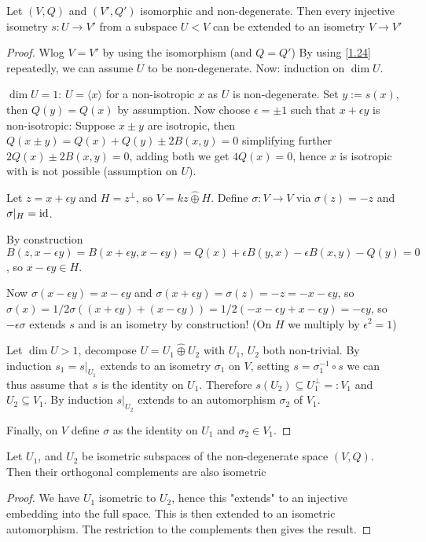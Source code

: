 \begin{theorem}[Witt]
  Let $(V, Q)$ and $(V', Q')$ isomorphic and 
  non-degenerate. Then every injective isometry 
  $s:U\to V'$ from a subspace $U<V$ can be extended to an isometry
  $V\to V'$
\end{theorem}
\begin{proof}
  Wlog $V = V'$ by using the isomorphism (and $Q = Q'$)
  By using \ref{1.24} repeatedly, we can assume $U$ to be non-degenerate.
  Now: induction on $\dim U$.

  $\dim U = 1$: $U = \langle x\rangle$ for a non-isotropic $x$ as $U$ is 
  non-degenerate. Set $y := s(x)$, then $Q(y) = Q(x)$ by assumption.
  Now choose $\epsilon=\pm1$ such that $x+\epsilon y$ is non-isotropic:
  Suppose $x\pm y$ are isotropic, then $Q(x\pm y) = Q(x) + Q(y) \pm 2B(x,y) = 0$  simplifying further $2Q(x) \pm 2B(x,y) = 0$, adding both we get
  $4Q(x) = 0$, hence $x$ is isotropic with is not possible (assumption on $U$).

  Let $z = x+\epsilon y$ and $H = z^\perp$, so $V = kz \hat\oplus H$.
  Define $\sigma:V \to V$ via $\sigma(z) = -z$ and $\sigma|_H = \mathop{\rm id}\nolimits$.

  By construction $B(z, x-\epsilon y) = B(x+\epsilon y, x-\epsilon y) = Q(x) 
  +\epsilon B(y, x) - \epsilon B(x, y) - Q(y) = 0$, so
  $x-\epsilon y\in H$.

  Now $\sigma(x-\epsilon y) = x-\epsilon y$ and $\sigma(x+\epsilon y) = \sigma(z) = -z = -x-\epsilon y$, so $\sigma(x) = 1/2\sigma((x+\epsilon y) + (x-\epsilon y)) = 1/2(-x-\epsilon y + x-\epsilon y) = -\epsilon y$,
  so $-\epsilon \sigma$ extends $s$ and is an isometry by construction! (On $H$
  we multiply by $\epsilon^2 = 1$)

  Let $\dim U>1$, decompose $U = U_1\hat\oplus U_2$ with $U_1$, $U_2$ both 
  non-trivial. By induction $s_1 = s|_{U_1}$ extends to an isometry $\sigma_1$
  on $V$,
  setting $s = \sigma_1^{-1}\circ s$ we can thus assume that $s$ is the identity
  on $U_1$.
  Therefore $s(U_2) \subseteq U_1^\perp =: V_1$ and $U_2\subseteq V_1$.
  By induction
  $s|_{U_2}$ extends to an automorphism $\sigma_2$ of $V_1$.

  Finally, on $V$ define $\sigma$ as the identity on $U_1$ and $\sigma_2\in V_1$.
\end{proof}

\begin{korollar}
  Let $U_1$, and $U_2$ be isometric subspaces of the non-degenerate space
  $(V, Q)$. Then their orthogonal complements are also isometric
\end{korollar}
\begin{proof}
  We have $U_1$ isometric to $U_2$, hence this "extends" to an 
  injective embedding into the full space. This is then extended to an
  isometric automorphism. The restriction to the complements then gives
  the result.
\end{proof}

